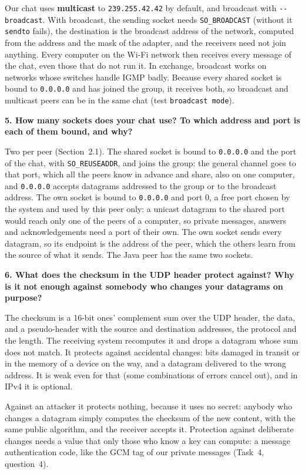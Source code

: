 \documentclass[11pt,a4paper]{article}
\newcommand{\question}[1]{\par\medskip\textbf{#1}\par}
\newcommand{\code}[1]{{\frenchspacing\texttt{#1}}}
\begin{document}
Our chat uses \textbf{multicast} to \code{239.255.42.42} by default, and broadcast with
\code{-{}-broadcast}. With broadcast, the sending socket needs \code{SO\_BROADCAST} (without it
\code{sendto} fails), the destination is the broadcast address of the network, computed from the
address and the mask of the adapter, and the receivers need not join anything. Every computer on the
Wi-Fi network then receives every message of the chat, even those that do not run it. In exchange,
broadcast works on networks whose switches handle IGMP badly. Because every shared socket is bound to
\code{0.0.0.0} and has joined the group, it receives both, so broadcast and multicast peers can be in
the same chat (test \code{broadcast mode}).

\question{5. How many sockets does your chat use? To which address and port is each of them bound,
and why?}

Two per peer (Section~2.1). The shared socket is bound to \code{0.0.0.0} and the port of the chat,
with \code{SO\_REUSEADDR}, and joins the group: the general channel goes to that port, which all the
peers know in advance and share, also on one computer, and \code{0.0.0.0} accepts datagrams addressed
to the group or to the broadcast address. The own socket is bound to \code{0.0.0.0} and port 0, a free
port chosen by the system and used by this peer only: a unicast datagram to the shared port would
reach only one of the peers of a computer, so private messages, answers and acknowledgements need a
port of their own. The own socket sends every datagram, so its endpoint is the address of the peer,
which the others learn from the source of what it sends. The Java peer has the same two sockets.

\question{6. What does the checksum in the UDP header protect against? Why is it not enough against
somebody who changes your datagrams on purpose?}

The checksum is a 16-bit ones' complement sum over the UDP header, the data, and a pseudo-header with
the source and destination addresses, the protocol and the length. The receiving system recomputes it
and drops a datagram whose sum does not match. It protects against accidental changes: bits damaged
in transit or in the memory of a device on the way, and a datagram delivered to the wrong address. It
is weak even for that (some combinations of errors cancel out), and in IPv4 it is optional.

Against an attacker it protects nothing, because it uses no secret: anybody who changes a datagram
simply computes the checksum of the new content, with the same public algorithm, and the receiver
accepts it. Protection against deliberate changes needs a value that only those who know a key can
compute: a message authentication code, like the GCM tag of our private messages (Task~4,
question~4).
\end{document}
